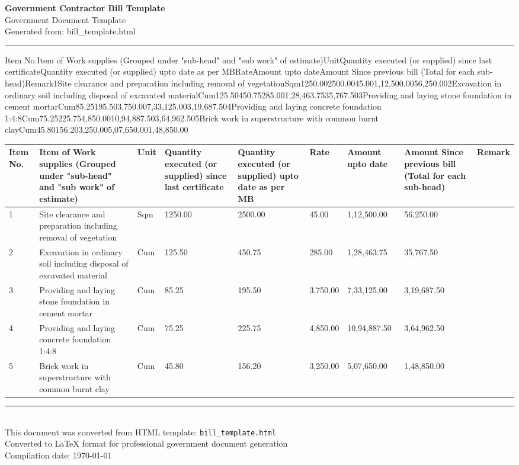 \documentclass[11pt, landscape]{article}
\begin{document}
\begin{center}
{\LARGE \textbf{Government Contractor Bill Template}}\\[0.5cm]
{\large Government Document Template}\\[0.4cm]
{\normalsize Generated from: bill_template.html}\\[0.3cm]
\rule{\textwidth}{0.8pt}
\end{center}

\vspace{1cm}

Item No.Item of Work supplies (Grouped under "sub-head" and "sub work" of estimate)UnitQuantity executed (or supplied) since last certificateQuantity executed (or supplied) upto date as per MBRateAmount upto dateAmount Since previous bill (Total for each sub-head)Remark1Site clearance and preparation including removal of vegetationSqm1250.002500.0045.001,12,500.0056,250.002Excavation in ordinary soil including disposal of excavated materialCum125.50450.75285.001,28,463.7535,767.503Providing and laying stone foundation in cement mortarCum85.25195.503,750.007,33,125.003,19,687.504Providing and laying concrete foundation 1:4:8Cum75.25225.754,850.0010,94,887.503,64,962.505Brick work in superstructure with common burnt clayCum45.80156.203,250.005,07,650.001,48,850.00\\[0.2cm]

\vspace{1cm}

\begin{longtable}{|p{18.9mm}|p{18.9mm}|p{18.9mm}|p{18.9mm}|p{18.9mm}|p{18.9mm}|p{18.9mm}|p{18.9mm}|p{18.9mm}|}
\hline
\textbf{Item No.} & \textbf{Item of Work supplies (Grouped under "sub-head" and "sub work" of estimate)} & \textbf{Unit} & \textbf{Quantity executed (or supplied) since last certificate} & \textbf{Quantity executed (or supplied) upto date as per MB} & \textbf{Rate} & \textbf{Amount upto date} & \textbf{Amount Since previous bill (Total for each sub-head)} & \textbf{Remark} \\
\hline
\endhead
1 & Site clearance and preparation including removal of vegetation & Sqm & 1250.00 & 2500.00 & 45.00 & 1,12,500.00 & 56,250.00 &  \\
\hline
2 & Excavation in ordinary soil including disposal of excavated material & Cum & 125.50 & 450.75 & 285.00 & 1,28,463.75 & 35,767.50 &  \\
\hline
3 & Providing and laying stone foundation in cement mortar & Cum & 85.25 & 195.50 & 3,750.00 & 7,33,125.00 & 3,19,687.50 &  \\
\hline
4 & Providing and laying concrete foundation 1:4:8 & Cum & 75.25 & 225.75 & 4,850.00 & 10,94,887.50 & 3,64,962.50 &  \\
\hline
5 & Brick work in superstructure with common burnt clay & Cum & 45.80 & 156.20 & 3,250.00 & 5,07,650.00 & 1,48,850.00 &  \\
\hline
\end{longtable}

\vspace{1cm}

\begin{center}
\rule{\textwidth}{0.4pt}\\[0.3cm]
{\small This document was converted from HTML template: \texttt{bill_template.html}}\\
{\small Converted to LaTeX format for professional government document generation}\\
{\small Compilation date: \today}
\end{center}
\end{document}
